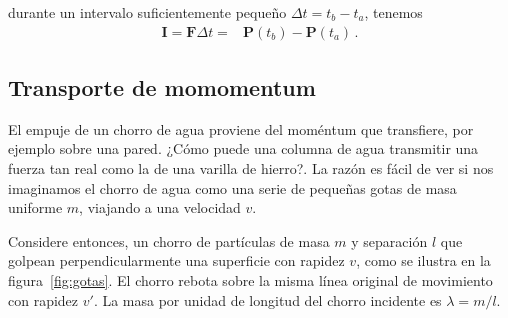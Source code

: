 durante un intervalo suficientemente pequeño $\Delta t=t_b-t_a$, tenemos
\begin{align}
   \mathbf{I}=\mathbf{F}\Delta t=&\mathbf{P}(t_b)-\mathbf{P}(t_a)\,.
\end{align}

\subsection{Transporte de momomentum}

El empuje de un chorro de agua proviene del moméntum que transfiere, por ejemplo sobre una pared. ¿Cómo puede una columna de agua transmitir una fuerza tan real como la de una varilla de hierro?. La razón es fácil de ver si nos imaginamos el chorro de agua como una serie de pequeñas gotas de masa uniforme $m$, viajando a una velocidad $v$.  

Considere entonces, un chorro de partículas de masa $m$ y separación
$l$ que golpean perpendicularmente una superficie con rapidez $v$,
como se ilustra en la figura~\ref{fig:gotas}. El chorro rebota sobre
la misma línea original de movimiento con rapidez $v'$. La masa por
unidad de longitud del chorro incidente es $\lambda=m/l$.

